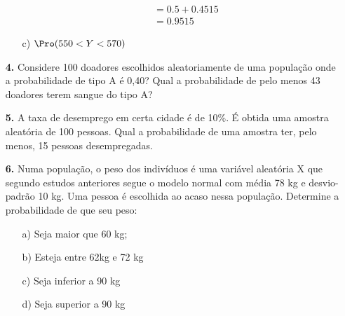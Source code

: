 \begin{itemize}
\begin{itemize}
{\begin{align*}
                &= 0.5 + 0.4515\\
                &= 0.9515
            \end{align*}
        }
		\item[c)] $\Pro(550<Y<570)$\\
	\end{itemize}
	
	\item[\textbf{4.}] Considere 100 doadores escolhidos aleatoriamente de uma população onde a probabilidade de tipo A é 0,40? Qual a probabilidade de pelo menos 43 doadores terem sangue do tipo A?
	
	\item[\textbf{5.}] A taxa de desemprego em certa cidade é de 10\%. É obtida uma amostra aleatória de 100 pessoas. Qual a probabilidade de uma amostra ter, pelo menos, 15 pessoas desempregadas.
	
	\item[\textbf{6.}] Numa população, o peso dos indivíduos é uma variável aleatória X que segundo estudos anteriores segue o modelo normal com média 78 kg e desvio-padrão 10 kg. Uma pessoa é escolhida ao acaso nessa população. Determine a probabilidade de que seu peso:
		\begin{itemize}
		\item[a)] Seja maior que 60 kg;
	        \resposta{}
		\item[b)] Esteja entre 62kg e 72 kg
		    \resposta{}
		\item[c)] Seja inferior a 90 kg
		    \resposta{}
		\item[d)] Seja superior a 90 kg
		    \resposta{}
	\end{itemize}
	
\end{itemize}